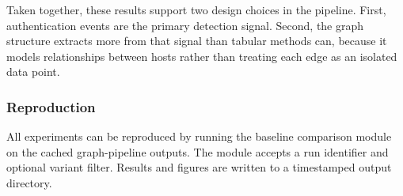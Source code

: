 Taken together, these results support two design choices in the pipeline. First, authentication events are the primary detection signal. Second, the graph structure extracts more from that signal than tabular methods can, because it models relationships between hosts rather than treating each edge as an isolated data point.

\subsubsection{Reproduction}

All experiments can be reproduced by running the baseline comparison module on the cached graph-pipeline outputs. The module accepts a run identifier and optional variant filter. Results and figures are written to a timestamped output directory.
